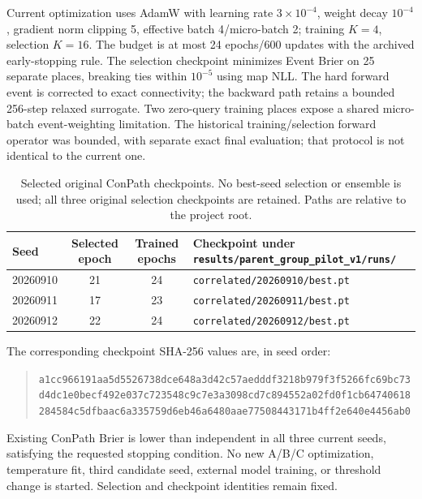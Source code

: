\documentclass[conference,letterpaper,10pt,onecolumn]{IEEEtran}
\begin{document}
Current optimization uses AdamW with learning rate $3\times10^{-4}$, weight decay $10^{-4}$, gradient norm clipping 5, effective batch 4/micro-batch 2; training $K=4$, selection $K=16$. The budget is at most 24 epochs/600 updates with the archived early-stopping rule. The selection checkpoint minimizes Event Brier on 25 separate places, breaking ties within $10^{-5}$ using map NLL. The hard forward event is corrected to exact connectivity; the backward path retains a bounded 256-step relaxed surrogate. Two zero-query training places expose a shared micro-batch event-weighting limitation. The historical training/selection forward operator was bounded, with separate exact final evaluation; that protocol is not identical to the current one.

\begin{table}[H]
\centering\small
\caption{Selected original ConPath checkpoints. No best-seed selection or ensemble is used; all three original selection checkpoints are retained. Paths are relative to the project root.}
\begin{tabular}{@{}lccp{4.1in}@{}}\toprule
Seed & Selected epoch & Trained epochs & Checkpoint under \texttt{results/parent\_group\_pilot\_v1/runs/}\\\midrule
20260910 & 21 & 24 & \texttt{correlated/20260910/best.pt}\\
20260911 & 17 & 23 & \texttt{correlated/20260911/best.pt}\\
20260912 & 22 & 24 & \texttt{correlated/20260912/best.pt}\\\bottomrule
\end{tabular}
\end{table}
The corresponding checkpoint SHA-256 values are, in seed order:
\begin{quote}\footnotesize\ttfamily
\nolinkurl{a1cc966191aa5d5526738dce648a3d42c57aedddf3218b979f3f5266fc69bc73}\\
\nolinkurl{d4dc1e0becf492e037c723548c9c7e3a3098cd7c894552a02fd0f1cb64740618}\\
\nolinkurl{284584c5dfbaac6a335759d6eb46a6480aae77508443171b4ff2e640e4456ab0}
\end{quote}
Existing ConPath Brier is lower than independent in all three current seeds, satisfying the requested stopping condition. No new A/B/C optimization, temperature fit, third candidate seed, external model training, or threshold change is started. Selection and checkpoint identities remain fixed.
\end{document}
